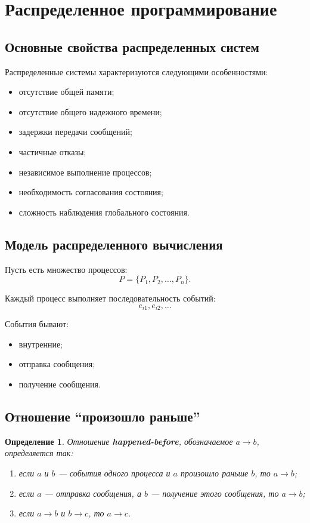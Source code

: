 \documentclass[12pt,a4paper]{article}
\newtheorem{definition}{Определение}
\begin{document}
\section{Распределенное программирование}

\subsection{Основные свойства распределенных систем}

Распределенные системы характеризуются следующими особенностями:
\begin{itemize}
    \item отсутствие общей памяти;
    \item отсутствие общего надежного времени;
    \item задержки передачи сообщений;
    \item частичные отказы;
    \item независимое выполнение процессов;
    \item необходимость согласования состояния;
    \item сложность наблюдения глобального состояния.
\end{itemize}

\subsection{Модель распределенного вычисления}

Пусть есть множество процессов:
\[
P = \{P_1, P_2, \dots, P_n\}.
\]

Каждый процесс выполняет последовательность событий:
\[
e_{i1}, e_{i2}, \dots
\]

События бывают:
\begin{itemize}
    \item внутренние;
    \item отправка сообщения;
    \item получение сообщения.
\end{itemize}

\subsection{Отношение ``произошло раньше''}

\begin{definition}
Отношение \textbf{happened-before}, обозначаемое $a \rightarrow b$, определяется так:
\begin{enumerate}
    \item если $a$ и $b$ --- события одного процесса и $a$ произошло раньше $b$, то $a \rightarrow b$;
    \item если $a$ --- отправка сообщения, а $b$ --- получение этого сообщения, то $a \rightarrow b$;
    \item если $a \rightarrow b$ и $b \rightarrow c$, то $a \rightarrow c$.
\end{enumerate}
\end{definition}
\end{document}
